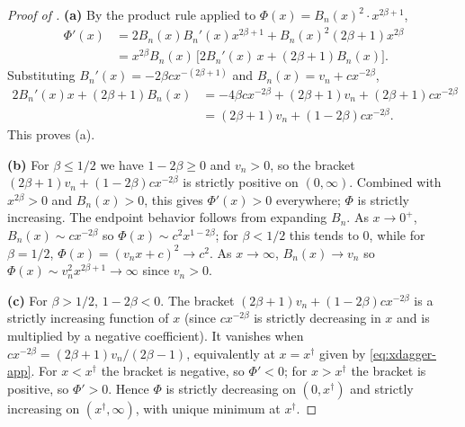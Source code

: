 \begin{proof}[Proof of ]
\textbf{(a)} By the product rule applied to $\Phi(x) = B_n(x)^2 \cdot x^{2\beta+1}$,
\begin{align*}
\Phi'(x)
&= 2 B_n(x) B_n'(x) x^{2\beta+1} + B_n(x)^2 (2\beta+1) x^{2\beta} \\
&= x^{2\beta} B_n(x)\, \bigl[2 B_n'(x)\, x + (2\beta+1) B_n(x)\bigr].
\end{align*}
Substituting $B_n'(x) = -2\beta c x^{-(2\beta+1)}$ and $B_n(x) = v_n + c x^{-2\beta}$,
\begin{align*}
2 B_n'(x) x + (2\beta+1) B_n(x)
&= -4\beta c x^{-2\beta} + (2\beta+1) v_n + (2\beta+1) c x^{-2\beta} \\
&= (2\beta+1) v_n + (1 - 2\beta) c x^{-2\beta}.
\end{align*}
This proves (a).

\textbf{(b)} For $\beta \le 1/2$ we have $1 - 2\beta \ge 0$ and $v_n > 0$, so the bracket $(2\beta+1) v_n + (1-2\beta) c x^{-2\beta}$ is strictly positive on $(0,\infty)$. Combined with $x^{2\beta} > 0$ and $B_n(x) > 0$, this gives $\Phi'(x) > 0$ everywhere; $\Phi$ is strictly increasing. The endpoint behavior follows from expanding $B_n$. As $x \to 0^+$, $B_n(x) \sim c x^{-2\beta}$ so $\Phi(x) \sim c^2 x^{1 - 2\beta}$; for $\beta < 1/2$ this tends to $0$, while for $\beta = 1/2$, $\Phi(x) = (v_n x + c)^2 \to c^2$. As $x \to \infty$, $B_n(x) \to v_n$ so $\Phi(x) \sim v_n^2 x^{2\beta+1} \to \infty$ since $v_n > 0$.

\textbf{(c)} For $\beta > 1/2$, $1 - 2\beta < 0$. The bracket $(2\beta+1) v_n + (1-2\beta) c x^{-2\beta}$ is a strictly increasing function of $x$ (since $c x^{-2\beta}$ is strictly decreasing in $x$ and is multiplied by a negative coefficient). It vanishes when $c x^{-2\beta} = (2\beta+1) v_n / (2\beta - 1)$, equivalently at $x = x^\dagger$ given by \cref{eq:xdagger-app}. For $x < x^\dagger$ the bracket is negative, so $\Phi' < 0$; for $x > x^\dagger$ the bracket is positive, so $\Phi' > 0$. Hence $\Phi$ is strictly decreasing on $(0, x^\dagger)$ and strictly increasing on $(x^\dagger, \infty)$, with unique minimum at $x^\dagger$.


\end{proof}
